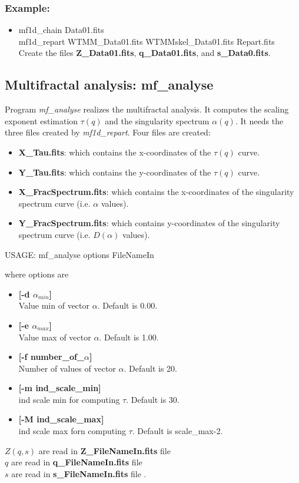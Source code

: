\subsubsection*{Example:}
\begin{itemize}
\item mf1d\_chain Data01.fits \\
      mf1d\_repart  WTMM\_Data01.fits WTMMskel\_Data01.fits Repart.fits  \\
 Create the files {\bf Z\_Data01.fits}, {\bf q\_Data01.fits}, and
 {\bf s\_Data0.fits}.
\end{itemize}


\subsection{Multifractal analysis: mf\_analyse}
Program {\em mf\_analyse} realizes the multifractal analysis. It
 computes the scaling
exponent estimation $\tau(q)$ and the singularity spectrum $\alpha(q)$.
It needs the three files created by {\em mf1d\_repart}. Four files are 
created:
\begin{itemize}
\item {\bf X\_Tau.fits}: which contains the x-coordinates of the 
$\tau(q)$ curve.
\item {\bf Y\_Tau.fits}: which contains the y-coordinates of the 
$\tau(q)$ curve.
\item {\bf X\_FracSpectrum.fits}: which contains the x-coordinates of the 
singularity spectrum curve (i.e. $\alpha$ values).
\item {\bf Y\_FracSpectrum.fits}: which contains y-coordinates of the 
singularity spectrum curve (i.e. $D(\alpha)$ values).
\end{itemize}

{\bf \begin{center}
 USAGE:  mf\_analyse options FileNameIn
\end{center}}
where options are 
\begin{itemize}
\item {\bf [-d $\alpha_{min}$]} \\
Value min of vector $\alpha$. Default is 0.00.
\item {\bf [-e $\alpha_{max}$]} \\
Value max of vector $\alpha$. Default is 1.00.
\item {\bf [-f number\_of\_$\alpha$]} \\
Number of values of vector $\alpha$. Default is 20.
\item {\bf [-m ind\_scale\_min]} \\
ind scale min for computing $\tau$. Default is 30. 
\item {\bf [-M ind\_scale\_max]} \\
ind scale max forn computing $\tau$. Default is scale\_max-2.
\end{itemize}
$Z(q,s)$ are read in {\bf Z\_FileNameIn.fits} file \\
$q$ are read in {\bf q\_FileNameIn.fits} file\\
$s$ are read in {\bf s\_FileNameIn.fits} file .
